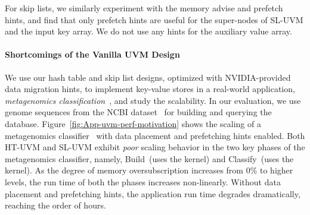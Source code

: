 \documentclass[12pt,a4paper]{article}
\newcommand{\htuvm}{\textsf{HT-UVM}\xspace}
\newcommand{\skipuvm}{\textsf{SL-UVM}\xspace}
\begin{document}
For skip lists, we similarly experiment with the memory advise and prefetch
hints, and find that only prefetch hints are useful for the super-nodes of
SL-UVM and the input key array. We do not use any hints for the auxiliary value
array.

\paragraph*{Shortcomings of the Vanilla UVM Design}


We use our hash table and skip list designs, optimized with NVIDIA-provided data migration hints, to implement key-value stores
in a real-world application, \emph{metagenomics classification}~\cite{cuclark,metacache-icpp-2021}, and study the scalability. %
In our evaluation, we use genome sequences from the NCBI dataset~\cite{refseq-ncbi} for building and querying the database.
Figure~\ref{fig:App-uvm-perf-motivation} shows the scaling of a metagenomics classifier~\cite{metacache-icpp-2021} with data placement and prefetching hints enabled.
Both \htuvm and \skipuvm exhibit \emph{poor} scaling behavior in the two key phases of the metagenomics classifier, namely, \textsf{Build}~(uses the  kernel) and \textsf{Classify}~(uses the  kernel). As the degree of memory oversubscription increases from 0\% to higher levels, the run time of both the phases increases non-linearly. %
Without data placement and prefetching hints, the application run time degrades dramatically, reaching the order of hours.
\end{document}
